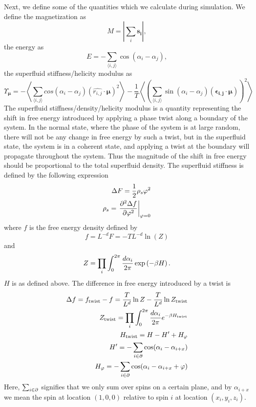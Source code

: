 Next, we define some of the quantities which we calculate during simulation.
We define the magnetization as 
\begin{equation}
  M = \left| \sum_i \bm{s_i}\right|,
  \label{}
\end{equation}
the energy as 
\begin{equation}
  E = -\sum\limits_{\langle i,j \rangle} \cos(\alpha_i - \alpha_j),
  \label{}
\end{equation}
the superfluid stiffness/helicity modulus as 
\begin{equation}
  \Upsilon_{\bm{\mu}} = -\left\langle \sum_{\langle i,j\rangle} cos(\alpha_i - \alpha_j) (\hat{r_{i,j}}\cdot \bm{\mu})^2 \right\rangle - \frac{1}{T}\left\langle\left(\sum_{\langle i,j\rangle} \sin(\alpha_i - \alpha_j)(\bm{\epsilon_{i,j}}\cdot \bm{\mu})\right)^2\right\rangle
  \label{}
\end{equation}
The superfluid stiffness/density/helicity modulus is a quantity representing the shift in free energy introduced by applying a phase twist along a boundary of the system.
In the normal state, where the phase of the system is at large random, there will not be any change in free energy by such a twist, but in the superfluid state, the system is in a coherent state, and applying a twist at the boundary will propagate throughout the system. Thus the magnitude of the shift in free energy should be proportional to the total superfluid density.
The superfluid stiffness is defined by the following expression
\begin{align}
  \Delta F = \frac{1}{2}\rho_s\varphi^2\\
  \rho_s = \left. \frac{\partial^{2} \Delta f}{\partial \varphi^2}\right|_{\varphi =0}
  \label{eq:rhos}
\end{align}
where $f$ is the free energy density defined by
\begin{equation}
  f = L^{-d}F = -TL^{-d}\ln(Z)
  \label{}
\end{equation}
and 
\begin{equation}
  Z = \prod_{i}\int_{0}^{2\pi}\frac{d \alpha_i}{2\pi} \exp\left(-\beta H\right).
  \label{}
\end{equation}
$H$ is as defined above.
The difference in free energy introduced by a twist is
\begin{align}
  \Delta f =f_{\textrm{twist}} - f = \frac{T}{L^d}\ln Z - \frac{T}{L^d}\ln Z_{\textrm{twist}}\\
  Z_{\textrm{twist}} = \prod_{i}\int_{0}^{2\pi}\frac{d \alpha_i}{2\pi} e^{-\beta H_{\textrm{twist}}}\\
  H_{\textrm{twist}} = H - H' + H_\varphi \\
  H' = -\sum_{i\in\partial} \cos(\alpha_i -\alpha_{i+x} )\\
  H_\varphi = -\sum_{i\in\partial} \cos(\alpha_i -\alpha_{i+x}+\varphi )\\
  \label{}
\end{align}
Here, $\sum_{i\in\partial}$ signifies that we only sum over spins on a certain plane, and by $\alpha_{i+x}$ we mean the spin at location $(1,0,0)$ relative to spin $i$ at location $(x_i,y_i,z_i)$.

